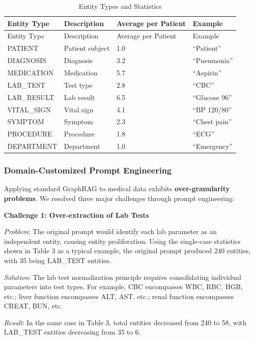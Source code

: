 \documentclass[11pt]{article}
\begin{document}
\begin{longtable}[]{@{}llll@{}}
\caption{Entity Types and Statistics}\tabularnewline
\toprule\noalign{}
Entity Type & Description & Average per Patient & Example \\
\midrule\noalign{}
\endfirsthead
\toprule\noalign{}
Entity Type & Description & Average per Patient & Example \\
\midrule\noalign{}
\endhead
\bottomrule\noalign{}
\endlastfoot
PATIENT & Patient subject & 1.0 & ``Patient'' \\
DIAGNOSIS & Diagnosis & 3.2 & ``Pneumonia'' \\
MEDICATION & Medication & 5.7 & ``Aspirin'' \\
LAB\_TEST & Test type & 2.8 & ``CBC'' \\
LAB\_RESULT & Lab result & 6.5 & ``Glucose 96'' \\
VITAL\_SIGN & Vital sign & 4.1 & ``BP 120/80'' \\
SYMPTOM & Symptom & 2.3 & ``Chest pain'' \\
PROCEDURE & Procedure & 1.8 & ``ECG'' \\
DEPARTMENT & Department & 1.0 & ``Emergency'' \\
\end{longtable}

\subsubsection{Domain-Customized Prompt Engineering}

Applying standard GraphRAG to medical data exhibits \textbf{over-granularity problems}. We resolved three major challenges through prompt engineering:

\textbf{Challenge 1: Over-extraction of Lab Tests}

\emph{Problem}: The original prompt would identify each lab parameter as an independent entity, causing entity proliferation. Using the single-case statistics shown in Table 3 as a typical example, the original prompt produced 240 entities, with 35 being LAB\_TEST entities.

\emph{Solution}: The lab test normalization principle requires consolidating individual parameters into test types. For example, CBC encompasses WBC, RBC, HGB, etc.; liver function encompasses ALT, AST, etc.; renal function encompasses CREAT, BUN, etc.

\emph{Result}: In the same case in Table 3, total entities decreased from 240 to 58, with LAB\_TEST entities decreasing from 35 to 6.
\end{document}
